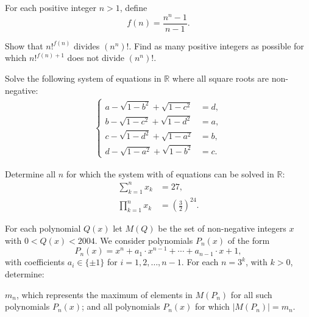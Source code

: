 \begin{question}[name={2003 Austrian--Polish}]
    For each positive integer $n>1$, define \[f(n) = \frac{n^n - 1}{n - 1}.\]
    \begin{tasks}
        \task Show that $n!^{f(n)}$ divides $(n^n)!$.
        \task Find as many positive integers as possible for which $n!^{f(n)+1}$ does not divide $(n^n)!$.
    \end{tasks} 
\end{question}


\begin{question}[name={2004 Austrian--Polish}]
    Solve the following system of equations in $\mathbb{R}$ where all square roots are non-negative:
    \begin{align*}
        \begin{cases}
            a  - \sqrt{1-b^2} + \sqrt{1-c^2} &= d, \\
            b -  \sqrt{1-c^2} + \sqrt{1-d^2} &= a, \\
            c -  \sqrt{1-d^2} + \sqrt{1-a^2} &= b, \\
            d -  \sqrt{1-a^2} + \sqrt{1-b^2} &= c.
        \end{cases}
    \end{align*}
\end{question}



\begin{question}[name={2004 Austrian--Polish}]
    Determine all $n$ for which the system with of equations can be solved in $\mathbb{R}$: 
    \begin{align*}
        \sum^{n}_{k=1} x_k &= 27,\\
        \prod^{n}_{k=1} x_k &= \left( \frac{3}{2} \right)^{24}.
    \end{align*}
\end{question}



\begin{question}[name={2004 Austrian--Polish}]
    For each polynomial $Q(x)$ let $M(Q)$ be the set of non-negative integers $x$ with $0 < Q(x) < 2004$. We consider polynomials $P_n(x)$ of the form \[P_n(x) = x^n + a_1 \cdot x^{n-1} + \cdots + a_{n-1} \cdot x + 1,\] with coefficients $a_i \in \{ \pm1\}$ for $i = 1, 2, \dots, n-1.$ For each $n = 3^k$, with $k > 0$, determine:
    \begin{tasks}
        \task $m_n$, which represents the maximum of elements in $M(P_n)$ for all such polynomials $P_n(x)$; and
        \task all polynomials $P_n(x)$ for which $|M(P_n)| = m_n$.
    \end{tasks}
\end{question}




